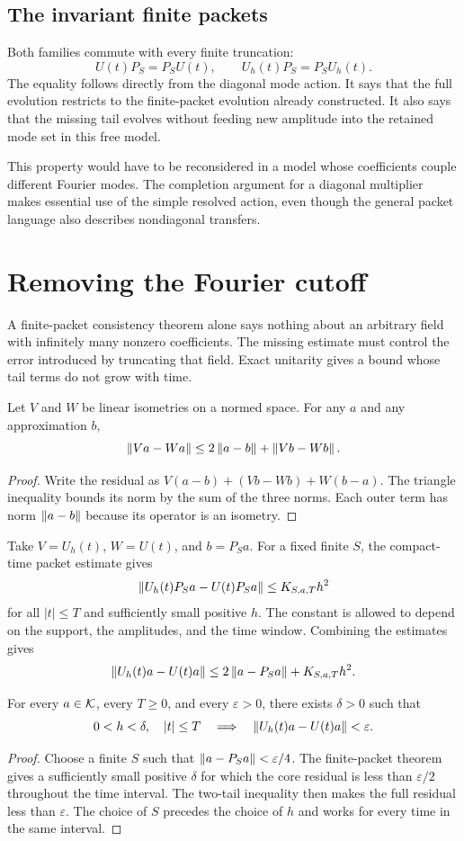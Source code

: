 \subsection{The invariant finite packets}
Both families commute with every finite truncation:
\[
U(t)P_S=P_SU(t),\qquad U_h(t)P_S=P_SU_h(t).
\]
The equality follows directly from the diagonal mode action. It says that the full evolution restricts to the finite-packet evolution already constructed. It also says that the missing tail evolves without feeding new amplitude into the retained mode set in this free model.

This property would have to be reconsidered in a model whose coefficients couple different Fourier modes. The completion argument for a diagonal multiplier makes essential use of the simple resolved action, even though the general packet language also describes nondiagonal transfers.

\section{Removing the Fourier cutoff}
A finite-packet consistency theorem alone says nothing about an arbitrary field with infinitely many nonzero coefficients. The missing estimate must control the error introduced by truncating that field. Exact unitarity gives a bound whose tail terms do not grow with time.

\begin{lemma}
Let $V$ and $W$ be linear isometries on a normed space. For any $a$ and any approximation $b$,
\[
\left\lVert Va-Wa\right\rVert\le 2\left\lVert a-b\right\rVert+\left\lVert Vb-Wb\right\rVert.
\]
\end{lemma}
\begin{proof}
Write the residual as $V(a-b)+(Vb-Wb)+W(b-a)$. The triangle inequality bounds its norm by the sum of the three norms. Each outer term has norm $\left\lVert a-b\right\rVert$ because its operator is an isometry.
\end{proof}

Take $V=U_h(t)$, $W=U(t)$, and $b=P_Sa$. For a fixed finite $S$, the compact-time packet estimate gives
\[
\left\lVert U_h(t)P_Sa-U(t)P_Sa\right\rVert\le K_{S,a,T}h^2
\]
for all $|t|\le T$ and sufficiently small positive $h$. The constant is allowed to depend on the support, the amplitudes, and the time window. Combining the estimates gives
\[
\left\lVert U_h(t)a-U(t)a\right\rVert\le
2\left\lVert a-P_Sa\right\rVert+K_{S,a,T}h^2.
\]

\begin{theorem}
For every $a\in\mathcal K$, every $T\ge0$, and every $\varepsilon>0$, there exists $\delta>0$ such that
\[
0<h<\delta,\quad |t|\le T
\quad\Longrightarrow\quad
\left\lVert U_h(t)a-U(t)a\right\rVert<\varepsilon.
\]
\end{theorem}
\begin{proof}
Choose a finite $S$ such that $\left\lVert a-P_Sa\right\rVert<\varepsilon/4$. The finite-packet theorem gives a sufficiently small positive $\delta$ for which the core residual is less than $\varepsilon/2$ throughout the time interval. The two-tail inequality then makes the full residual less than $\varepsilon$. The choice of $S$ precedes the choice of $h$ and works for every time in the same interval.
\end{proof}


